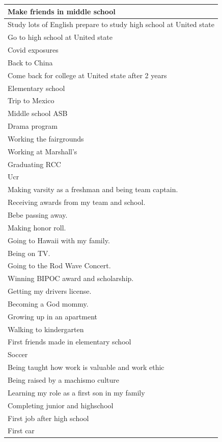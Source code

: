 \documentclass[
  .7em,
  letterpaper,
  DIV=11,
  numbers=noendperiod]{scrartcl}
\begin{document}
\begin{table}
\begin{tabular}{l}
\hline
Make friends in middle school\\
\hline
Study lots of English prepare to study high school at United state\\
\hline
Go to high school at United state\\
\hline
Covid exposures\\
\hline
Back to China\\
\hline
Come back for college at United state after 2 years\\
\hline
Elementary school\\
\hline
Trip to Mexico\\
\hline
Middle school ASB\\
\hline
Drama program\\
\hline
Working the fairgrounds\\
\hline
Working at Marshall’s\\
\hline
Graduating RCC\\
\hline
Ucr\\
\hline
Making varsity as a freshman and being team captain.\\
\hline
Receiving awards from my team and school.\\
\hline
Bebe passing away.\\
\hline
Making honor roll.\\
\hline
Going to Hawaii with my family.\\
\hline
Being on TV.\\
\hline
Going to the Rod Wave Concert.\\
\hline
Winning BIPOC award and scholarship.\\
\hline
Getting my drivers license.\\
\hline
Becoming a God mommy.\\
\hline
Growing up in an apartment\\
\hline
Walking to kindergarten\\
\hline
First friends made in elementary school\\
\hline
Soccer\\
\hline
Being taught how work is valuable and work ethic\\
\hline
Being raised by a machismo culture\\
\hline
Learning my role as a first son in my family\\
\hline
Completing junior and highschool\\
\hline
First job after high school\\
\hline
First car\\

\end{tabular}
\end{table}
\end{document}
